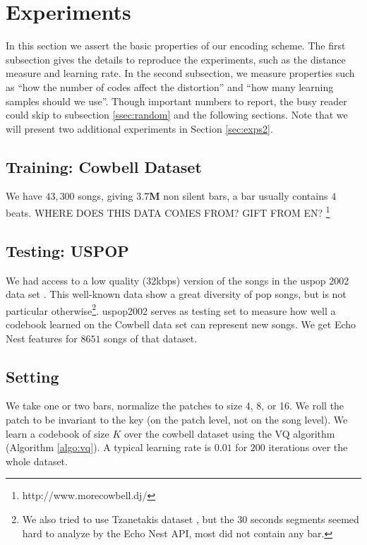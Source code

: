 \documentclass{article}
\begin{document}
\section{Experiments}\label{sec:experiments}
In this section we assert the basic properties of our encoding scheme.
The first subsection gives the details to reproduce the experiments,
such as the distance measure and learning rate. In the second subsection, we
measure properties such as ``how the number of codes affect the distortion''
and ``how many learning samples should we use''. Though important numbers
to report, the busy reader could skip to subsection \ref{ssec:random}
and the following sections.
Note that we will present two additional experiments in 
Section \ref{sec:exps2}.


\subsection{Training: Cowbell Dataset}\label{sec:traindata}
We have $43,300$ songs, giving  
$\mathbf{3.7}$\textbf{M} 
non silent bars, a bar usually 
contains $4$ beats. WHERE DOES THIS DATA COMES FROM? GIFT FROM EN?
\footnote{http://www.morecowbell.dj/}

\subsection{Testing: USPOP}\label{sec:testdata}
We had access to a low quality (32kbps) version of the songs in the uspop 2002 
data set \cite{uspop2002}.
This well-known data show a great diversity of pop songs, but is not particular
otherwise\footnote{We 
also tried to use Tzanetakis dataset \cite{Tzanetakis2002a}, but 
the $30$ seconds segments seemed hard to analyze by the Echo Nest API, most did
not contain any bar.}.
uspop2002 serves as testing set to measure how well a codebook learned on
the Cowbell data set can represent new songs. We get Echo Nest features
for $8651$ songs of that dataset.


\subsection{Setting}\label{ssec:setting}
We take one or two bars, normalize the patches to size 4, 8, or 16.
We roll the patch to be invariant to the key (on the patch level, not on
the song level). We learn a codebook of size $K$ over the cowbell dataset 
using the VQ algorithm (Algorithm \ref{algo:vq}). A typical learning rate 
is $0.01$ for $200$ iterations over the whole dataset.
\end{document}
